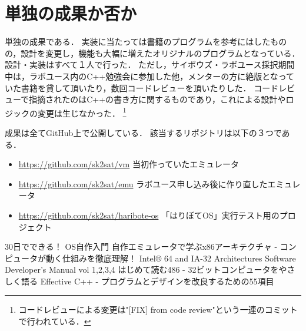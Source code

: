 \documentclass[10pt,a4j]{jsarticle}
\begin{document}
\section{単独の成果か否か}
単独の成果である．
実装に当たっては書籍\cite{learn-x86-by-emu}のプログラムを参考にはしたものの，設計を変更し，機能も大幅に増えたオリジナルのプログラムとなっている．
設計・実装はすべて１人で行った．
ただし，サイボウズ・ラボユース採択期間中は，ラボユース内のC++勉強会に参加した他，メンターの方に絶版となっていた書籍\cite{read-486}を貸して頂いたり，数回コードレビューを頂いたりした．
コードレビューで指摘されたのはC++の書き方に関するものであり，これによる設計やロジックの変更は生じなかった．
\footnote{コードレビューによる変更は"[FIX] from code review"という一連のコミットで行われている．}

成果は全てGitHub上で公開している．
該当するリポジトリは以下の３つである．
\begin{itemize}
	\item \url{https://github.com/sk2sat/vm}			当初作っていたエミュレータ
	\item \url{https://github.com/sk2sat/emu}			ラボユース申し込み後に作り直したエミュレータ
	\item \url{https://github.com/sk2sat/haribote-os}	「はりぼてOS」実行テスト用のプロジェクト
\end{itemize}

\begin{thebibliography}{99}
	 30日でできる！ OS自作入門
	 自作エミュレータで学ぶx86アーキテクチャ - コンピュータが動く仕組みを徹底理解！
	 Intel® 64 and IA-32 Architectures Software Developer’s Manual vol 1,2,3,4
	 はじめて読む486 - 32ビットコンピュータをやさしく語る
	 Effective C++ - プログラムとデザインを改良するための55項目
\end{thebibliography}
\end{document}
